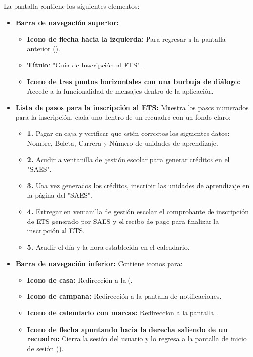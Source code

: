 La pantalla contiene los siguientes elementos:
\begin{itemize}
	\item \textbf{Barra de navegación superior:}
	\begin{itemize}
		\item \textbf{Icono de flecha hacia la izquierda:} Para regresar a la pantalla anterior ().
		\item \textbf{Título:} "Guía de Inscripción al ETS".
		\item \textbf{Icono de tres puntos horizontales con una burbuja de diálogo:} Accede a la funcionalidad de mensajes dentro de la aplicación.
	\end{itemize}
	\item \textbf{Lista de pasos para la inscripción al ETS:} Muestra los pasos numerados para la inscripción, cada uno dentro de un recuadro con un fondo claro:
	\begin{itemize}
		\item \textbf{1.} Pagar en caja y verificar que estén correctos los siguientes datos: Nombre, Boleta, Carrera y Número de unidades de aprendizaje.
		\item \textbf{2.} Acudir a ventanilla de gestión escolar para generar créditos en el "SAES".
		\item \textbf{3.} Una vez generados los créditos, inscribir las unidades de aprendizaje en la página del "SAES".
		\item \textbf{4.} Entregar en ventanilla de gestión escolar el comprobante de inscripción de ETS generado por SAES y el recibo de pago para finalizar la inscripción al ETS.
		\item \textbf{5.} Acudir el día y la hora establecida en el calendario.
	\end{itemize}
	\item \textbf{Barra de navegación inferior:} Contiene iconos para:
	\begin{itemize}
		\item \textbf{Icono de casa:} Redirección a la (.
		\item \textbf{Icono de campana:} Redirección a la pantalla de notificaciones.
		\item \textbf{Icono de calendario con marcas:} Redirección a la pantalla .
		\item \textbf{Icono de flecha apuntando hacia la derecha saliendo de un recuadro:} Cierra la sesión del usuario y lo regresa a la pantalla de inicio de sesión ().
	\end{itemize}
\end{itemize}


